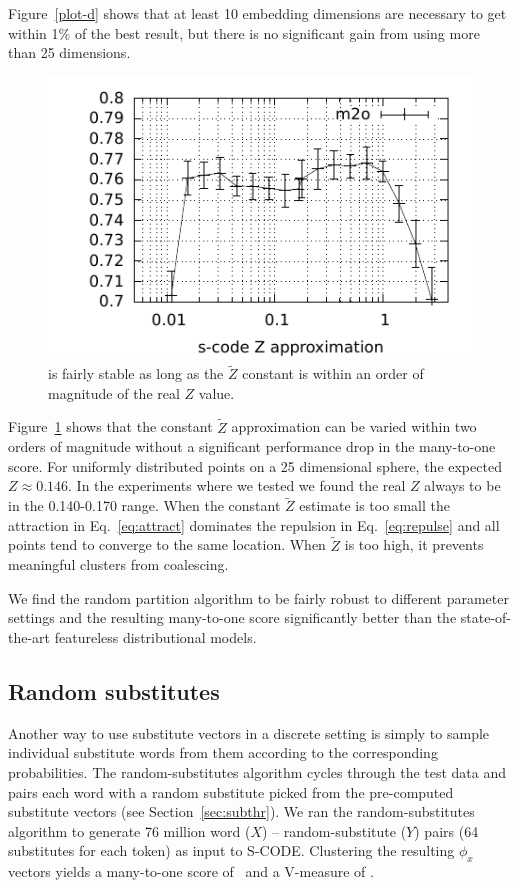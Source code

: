 Figure~\ref{plot-d} shows that at least 10 embedding dimensions are
necessary to get within 1\% of the best result, but there is no
significant gain from using more than 25 dimensions.

\begin{figure}[ht] \centering
\includegraphics[width=0.5\linewidth]{plot-z.pdf}
\caption{\mto is fairly stable as long as the $\tilde{Z}$ constant is
  within an order of magnitude of the real $Z$ value.}
\label{plot-z}
\end{figure}

Figure~\ref{plot-z} shows that the constant $\tilde{Z}$ approximation
can be varied within two orders of magnitude without a significant
performance drop in the many-to-one score.  For uniformly distributed
points on a 25 dimensional sphere, the expected $Z\approx 0.146$.  In
the experiments where we tested we found the real $Z$ always to be in
the 0.140-0.170 range.  When the constant $\tilde{Z}$ estimate is too
small the attraction in Eq.~\ref{eq:attract} dominates the repulsion
in Eq.~\ref{eq:repulse} and all points tend to converge to the same
location.  When $\tilde{Z}$ is too high, it prevents meaningful
clusters from coalescing.

We find the random partition algorithm to be fairly robust to
different parameter settings and the resulting many-to-one score
significantly better than the state-of-the-art featureless
distributional models.

\subsection{Random substitutes}\label{sec:wordsub}

Another way to use substitute vectors in a discrete setting is simply
to sample individual substitute words from them according to the
corresponding probabilities.  The random-substitutes algorithm cycles
through the test data and pairs each word with a random substitute
picked from the pre-computed substitute vectors (see
Section~\ref{sec:subthr}).  We ran the random-substitutes algorithm to
generate 76 million word ($X$) -- random-substitute ($Y$) pairs (64
substitutes for each token) as input to S-CODE.  Clustering the
resulting $\phi_x$ vectors yields a many-to-one score of \wsmto\ and a
V-measure of \wsvm.

